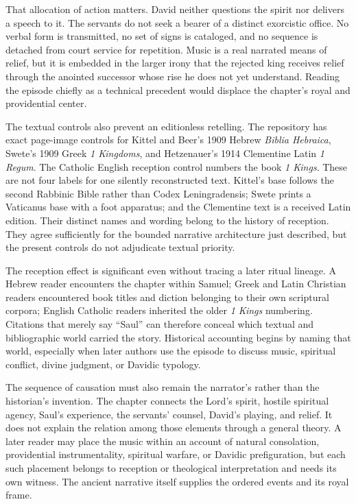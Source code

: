 That allocation of action matters. David neither questions the spirit nor
delivers a speech to it. The servants do not seek a bearer of a distinct
exorcistic office. No verbal form is transmitted, no set of signs is
cataloged, and no sequence is detached from court service for repetition.
Music is a real narrated means of relief, but it is embedded in the larger
irony that the rejected king receives relief through the anointed successor
whose rise he does not yet understand. Reading the episode chiefly as a
technical precedent would displace the chapter's royal and providential
center.

The textual controls also prevent an editionless retelling. The repository
has exact page-image controls for Kittel and Beer's 1909 Hebrew
\emph{Biblia Hebraica}, Swete's 1909 Greek \emph{1 Kingdoms}, and
Hetzenauer's 1914 Clementine Latin \emph{1 Regum}. The Catholic English
reception control numbers the book \emph{1 Kings}. These are not four labels
for one silently reconstructed text. Kittel's base follows the second
Rabbinic Bible rather than Codex Leningradensis; Swete prints a Vaticanus
base with a foot apparatus; and the Clementine text is a received Latin
edition. Their distinct names and wording belong to the history of reception.
They agree sufficiently for the bounded narrative architecture just described,
but the present controls do not adjudicate textual priority.

The reception effect is significant even without tracing a later ritual
lineage. A Hebrew reader encounters the chapter within Samuel; Greek and Latin
Christian readers encountered book titles and diction belonging to their own
scriptural corpora; English Catholic readers inherited the older
\emph{1 Kings} numbering. Citations that merely say ``Saul'' can therefore
conceal which textual and bibliographic world carried the story. Historical
accounting begins by naming that world, especially when later authors use the
episode to discuss music, spiritual conflict, divine judgment, or Davidic
typology.

The sequence of causation must also remain the narrator's rather than the
historian's invention. The chapter connects the Lord's spirit, hostile
spiritual agency, Saul's experience, the servants' counsel, David's playing,
and relief. It does not explain the relation among those elements through a
general theory. A later reader may place the music within an account of
natural consolation, providential instrumentality, spiritual warfare, or
Davidic prefiguration, but each such placement belongs to reception or
theological interpretation and needs its own witness. The ancient narrative
itself supplies the ordered events and its royal frame.

